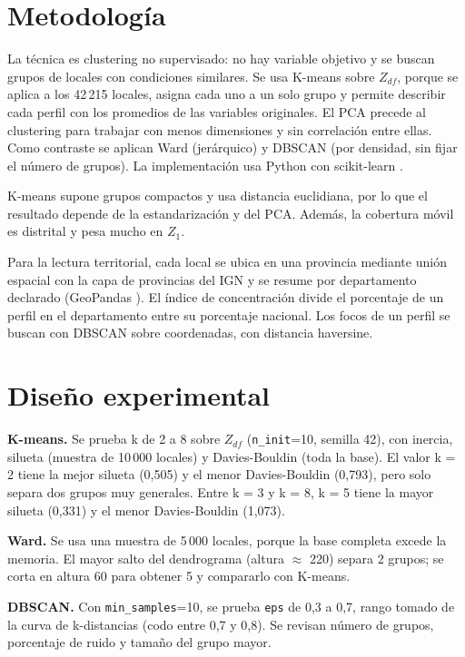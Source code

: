 \documentclass[conference]{IEEEtran}
\begin{document}
\section{Metodología}
La técnica es clustering no supervisado: no hay variable objetivo y se buscan grupos de locales con condiciones similares. Se usa K-means \cite{lloyd} sobre $Z_{df}$, porque se aplica a los 42\,215 locales, asigna cada uno a un solo grupo y permite describir cada perfil con los promedios de las variables originales. El PCA \cite{jolliffe} precede al clustering para trabajar con menos dimensiones y sin correlación entre ellas. Como contraste se aplican Ward \cite{ward} (jerárquico) y DBSCAN \cite{ester} (por densidad, sin fijar el número de grupos). La implementación usa Python con scikit-learn \cite{sklearn}.

K-means supone grupos compactos y usa distancia euclidiana, por lo que el resultado depende de la estandarización y del PCA. Además, la cobertura móvil es distrital y pesa mucho en $Z_1$.

Para la lectura territorial, cada local se ubica en una provincia mediante unión espacial con la capa de provincias del IGN \cite{ign} y se resume por departamento declarado (GeoPandas \cite{geopandas}). El índice de concentración divide el porcentaje de un perfil en el departamento entre su porcentaje nacional. Los focos de un perfil se buscan con DBSCAN sobre coordenadas, con distancia haversine.

\section{Diseño experimental}
\textbf{K-means.} Se prueba k de 2 a 8 sobre $Z_{df}$ (\texttt{n\_init}=10, semilla 42), con inercia, silueta \cite{rousseeuw} (muestra de 10\,000 locales) y Davies-Bouldin \cite{davies} (toda la base). El valor k = 2 tiene la mejor silueta (0,505) y el menor Davies-Bouldin (0,793), pero solo separa dos grupos muy generales. Entre k = 3 y k = 8, k = 5 tiene la mayor silueta (0,331) y el menor Davies-Bouldin (1,073).

\textbf{Ward.} Se usa una muestra de 5\,000 locales, porque la base completa excede la memoria. El mayor salto del dendrograma (altura $\approx$ 220) separa 2 grupos; se corta en altura 60 para obtener 5 y compararlo con K-means.

\textbf{DBSCAN.} Con \texttt{min\_samples}=10, se prueba \texttt{eps} de 0,3 a 0,7, rango tomado de la curva de k-distancias (codo entre 0,7 y 0,8). Se revisan número de grupos, porcentaje de ruido y tamaño del grupo mayor.
\end{document}
